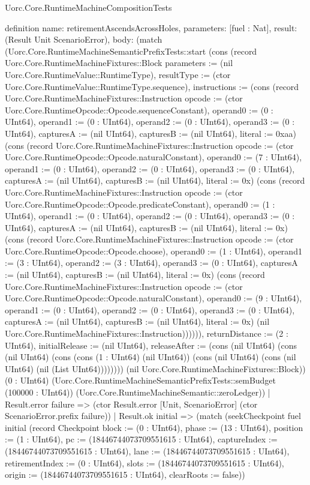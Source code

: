 \begin{lexlean}{Uorc.Core.RuntimeMachineCompositionTests}
\begin{semanticmodule}
definition{
  name: retirementAscendsAcrossHoles,
  parameters: [fuel : Nat],
  result: (Result Unit ScenarioError),
  body: (match (Uorc.Core.RuntimeMachineSemanticPrefixTests::start (cons (record Uorc.Core.RuntimeMachineFixtures::Block {parameters := (nil Uorc.Core.RuntimeValue::RuntimeType), resultType := (ctor Uorc.Core.RuntimeValue::RuntimeType.sequence), instructions := (cons (record Uorc.Core.RuntimeMachineFixtures::Instruction {opcode := (ctor Uorc.Core.RuntimeOpcode::Opcode.sequenceConstant), operand0 := (0 : UInt64), operand1 := (0 : UInt64), operand2 := (0 : UInt64), operand3 := (0 : UInt64), capturesA := (nil UInt64), capturesB := (nil UInt64), literal := 0xaa}) (cons (record Uorc.Core.RuntimeMachineFixtures::Instruction {opcode := (ctor Uorc.Core.RuntimeOpcode::Opcode.naturalConstant), operand0 := (7 : UInt64), operand1 := (0 : UInt64), operand2 := (0 : UInt64), operand3 := (0 : UInt64), capturesA := (nil UInt64), capturesB := (nil UInt64), literal := 0x}) (cons (record Uorc.Core.RuntimeMachineFixtures::Instruction {opcode := (ctor Uorc.Core.RuntimeOpcode::Opcode.predicateConstant), operand0 := (1 : UInt64), operand1 := (0 : UInt64), operand2 := (0 : UInt64), operand3 := (0 : UInt64), capturesA := (nil UInt64), capturesB := (nil UInt64), literal := 0x}) (cons (record Uorc.Core.RuntimeMachineFixtures::Instruction {opcode := (ctor Uorc.Core.RuntimeOpcode::Opcode.choose), operand0 := (1 : UInt64), operand1 := (3 : UInt64), operand2 := (3 : UInt64), operand3 := (0 : UInt64), capturesA := (nil UInt64), capturesB := (nil UInt64), literal := 0x}) (cons (record Uorc.Core.RuntimeMachineFixtures::Instruction {opcode := (ctor Uorc.Core.RuntimeOpcode::Opcode.naturalConstant), operand0 := (9 : UInt64), operand1 := (0 : UInt64), operand2 := (0 : UInt64), operand3 := (0 : UInt64), capturesA := (nil UInt64), capturesB := (nil UInt64), literal := 0x}) (nil Uorc.Core.RuntimeMachineFixtures::Instruction)))))), returnDistance := (2 : UInt64), initialRelease := (nil UInt64), releaseAfter := (cons (nil UInt64) (cons (nil UInt64) (cons (cons (1 : UInt64) (nil UInt64)) (cons (nil UInt64) (cons (nil UInt64) (nil (List UInt64)))))))}) (nil Uorc.Core.RuntimeMachineFixtures::Block)) (0 : UInt64) (Uorc.Core.RuntimeMachineSemanticPrefixTests::semBudget (100000 : UInt64)) (Uorc.Core.RuntimeMachineSemantic::zeroLedger))
    | Result.error failure => (ctor Result.error [Unit, ScenarioError] (ctor ScenarioError.prefix failure))
    | Result.ok initial => (match (seekCheckpoint fuel initial (record Checkpoint {block := (0 : UInt64), phase := (13 : UInt64), position := (1 : UInt64), pc := (18446744073709551615 : UInt64), captureIndex := (18446744073709551615 : UInt64), lane := (18446744073709551615 : UInt64), retirementIndex := (0 : UInt64), slots := (18446744073709551615 : UInt64), origin := (18446744073709551615 : UInt64), clearRoots := false}))
}
\end{semanticmodule}
\end{lexlean}
